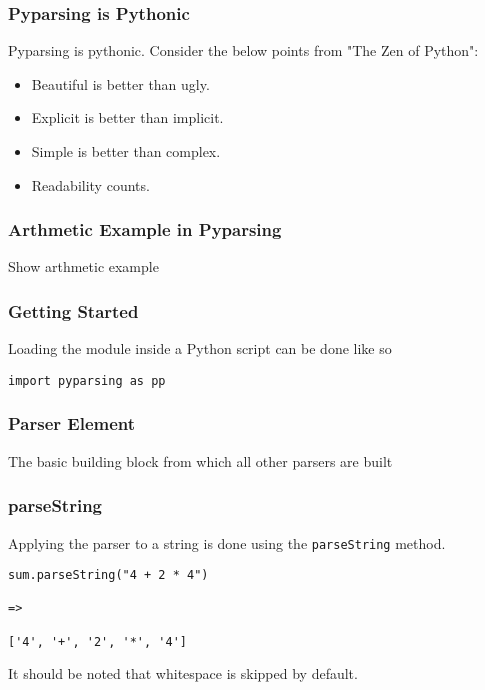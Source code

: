 \documentclass{beamer}
\begin{document}
\begin{frame}
\frametitle{Pyparsing is Pythonic}
Pyparsing is pythonic. Consider the below points from "The Zen of Python": \\
\bigskip
\begin{itemize}
\item Beautiful is better than ugly.
\item Explicit is better than implicit.
\item Simple is better than complex.
\item Readability counts.
\end{itemize}
\end{frame}

\begin{frame}
\frametitle{Arthmetic Example in Pyparsing}
Show arthmetic example
\end{frame}


\begin{frame}[fragile]
\frametitle{Getting Started}
Loading the module inside a Python script can be done like so
\begin{verbatim}
import pyparsing as pp
\end{verbatim}
\end{frame}


\begin{frame}
\frametitle{Parser Element}
The basic building block from which all other parsers are built
\begin{center}
\end{center}
\end{frame}



\begin{frame}[fragile]
\frametitle{parseString}
Applying the parser to a string is done using the \texttt{parseString} method.

\begin{verbatim}
sum.parseString("4 + 2 * 4")

=>

['4', '+', '2', '*', '4']
\end{verbatim}
It should be noted that whitespace is skipped by default.
\end{frame}
\end{document}
